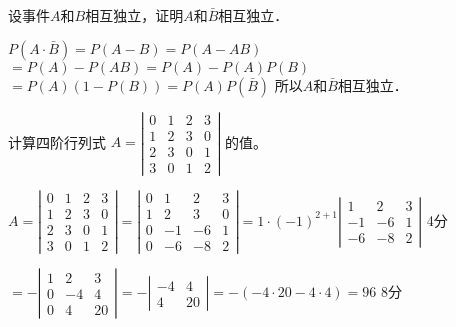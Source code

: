 \begin{question}
设事件$A$和$B$相互独立，证明$A$和$\bar{B}$相互独立．
\end{question}

\begin{solution}
$P (A \cdot \bar{B}) = P (A - B) = P (A - A B)$ 
\qquad $= P (A) - P (A B) = P (A) - P (A) P (B)$ 
\qquad $= P (A) (1 - P (B)) = P (A) P (\bar{B})$ 
所以$A$和$\bar{B}$相互独立．
\end{solution}


\begin{question}
计算四阶行列式 $A = \left|\begin{array}{cccc}
  0 & 1 & 2 & 3\\
  1 & 2 & 3 & 0\\
  2 & 3 & 0 & 1\\
  3 & 0 & 1 & 2
\end{array}\right|$ 的值。
\end{question}

\begin{solution}
$A = \left|\begin{array}{cccc}
    0 & 1 & 2 & 3\\
    1 & 2 & 3 & 0\\
    2 & 3 & 0 & 1\\
    3 & 0 & 1 & 2
  \end{array}\right| = \left|\begin{array}{cccc}
    0 & 1 & 2 & 3\\
    1 & 2 & 3 & 0\\
    0 & - 1 & - 6 & 1\\
    0 & - 6 & - 8 & 2
  \end{array}\right| = 1 \cdot (- 1)^{2 + 1} \left|\begin{array}{ccc}
    1 & 2 & 3\\
    - 1 & - 6 & 1\\
    - 6 & - 8 & 2
  \end{array}\right|$ \dotfill 4分\par
\qquad\qquad $= -\left|\begin{array}{ccc}
    1 & 2 & 3\\
    0 & - 4 & 4\\
    0 & 4 & 20
  \end{array}\right| = - \left|\begin{array}{cc}
    - 4 & 4\\
    4 & 20
  \end{array}\right| = -(-4\cdot20-4\cdot4) = 96$ \dotfill 8分
\end{solution}


